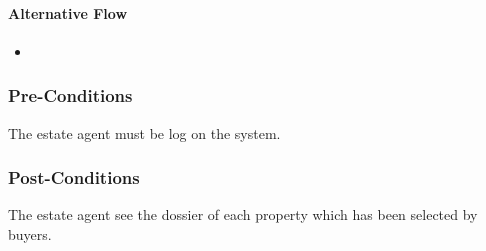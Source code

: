 \documentclass[a4paper,12pt]{article}
\begin{document}
\paragraph{Alternative Flow}
\begin{itemize}
\item
\end{itemize}
\subsubsection{Pre-Conditions}
The estate agent must be log on the system.
\subsubsection{Post-Conditions}
The estate agent see the dossier of each property which has been selected by buyers.
\end{document}
